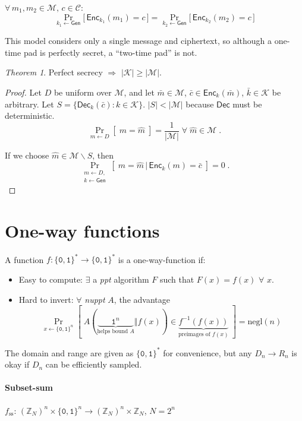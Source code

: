 \documentclass[11pt]{article}
\newcommand{\Gen}{\ensuremath{\mathsf{Gen}}}
\newcommand{\Enc}{\ensuremath{\mathsf{Enc}}}
\newcommand{\Dec}{\ensuremath{\mathsf{Dec}}}
\newcommand{\bit}{\ensuremath{\{\texttt{0},\texttt{1}\}}}
\newcommand{\abs}[1]{{\ensuremath{\left\vert#1\right\vert}}}
\newcommand{\ZZ}{\ensuremath{\mathds{Z}}}
\newcommand{\K}{\ensuremath{\mathcal{K}}}
\newcommand{\M}{\ensuremath{\mathcal{M}}}
\newcommand{\C}{\ensuremath{\mathcal{C}}}
\newcommand{\ppt}{\textit{ppt}}
\newcommand{\nuppt}{\textit{nuppt}}
\newcommand{\negl}{\text{negl}}
\theoremstyle{remark}
\newtheorem{thm}{Theorem}
\begin{document}
$\forall\, m_1, m_2 \in \M,\, c \in \C$:
\[ \Pr_{k_1\gets\Gen} \big[\, \Enc_{k_1}(m_1) = c \,\big]
 = \Pr_{k_2\gets\Gen} \big[\, \Enc_{k_2}(m_2) = c \,\big] \]

This model considers only a single message and ciphertext,
so although a one-time pad is perfectly secret, a ``two-time pad'' is not.

\begin{thm}
Perfect secrecy $\Rightarrow$ $\abs{\K} \ge \abs{\M}$.
\begin{proof}
Let $D$ be uniform over $\M$, and
let $\bar{m} \in \M$, $\bar{c} \in \Enc_k(\bar{m})$, $\bar{k}\in \K$ be arbitrary.
Let $S = \{ \Dec_k(\bar{c}) : k \in \K \}$.
$\abs{S} < \abs{\M}$ because $\Dec$ must be deterministic.
\[ \Pr_{m \gets D}[\;m = \hat{m}\;] = \frac{1}{\abs{\M}} \; \forall \; \hat{m} \in \M \; \text{.} \]

If we choose $\hat{m} \in \M\backslash S$, then
\[ \Pr_{\substack{m\gets D,\\k \gets \Gen}}[\; m = \hat{m} \,\vert\, \Enc_k(m) = \bar{c}\;] = 0 \; \text{.} \]
\end{proof}
\end{thm}

\section{One-way functions}

A function $f: \bit^* \rightarrow \bit^*$ is a one-way-function if:
\begin{itemize}
\item Easy to compute: $\exists$ a \ppt{} algorithm $F$ such that $F(x) = f(x)$ $\forall$ $x$.
\item Hard to invert: $\forall$ \nuppt{} $A$, the advantage
  \[ \Pr_{x\gets \bit^n}[\;
     A(\underbrace{\;\;\;\;\;\;\texttt{1}^n\;\;\;\;\;\;}_{\text{helps bound $A$}} \Vert f(x))
     \in \underbrace{f^{-1}(f(x))}_{\text{preimages of $f(x)$}}
  \;] = \negl(n) \]
\end{itemize}

The domain and range are given as $\bit^*$ for convenience,
but any $D_n \rightarrow R_n$ is okay if $D_n$ can be efficiently sampled.

\paragraph{Subset-sum}
$f_{\text{ss}}$: $(\ZZ_N)^n \times \bit^n \rightarrow (\ZZ_N)^n \times \ZZ_N$, $N = 2^n$
\end{document}
